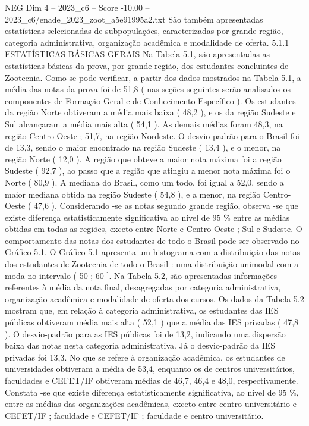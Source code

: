 \begin{textsample}{NEG Dim 4 – 2023\_c6 – Score -10.00 – 2023\_c6/enade\_2023\_zoot\_a5e91995a2.txt}
São também apresentadas estatísticas selecionadas de subpopulações, caracterizadas por grande região, categoria administrativa, organização acadêmica e modalidade de oferta. 5.1.1 ESTATÍSTICAS BÁSICAS GERAIS Na Tabela 5.1, são apresentadas as estatísticas básicas da prova, por grande região, dos estudantes concluintes de Zootecnia.
Como se pode verificar, a partir dos dados mostrados na Tabela 5.1, a média das notas da prova foi de 51,8 ( nas seções seguintes serão analisados os componentes de Formação Geral e de Conhecimento Específico ).
Os estudantes da região Norte obtiveram a média mais baixa ( 48,2 ), e os da região Sudeste e Sul alcançaram a média mais alta ( 54,1 ).
As demais médias foram 48,3, na região Centro-Oeste ; 51,7, na região Nordeste.
O desvio-padrão para o Brasil foi de 13,3, sendo o maior encontrado na região Sudeste ( 13,4 ), e o menor, na região Norte ( 12,0 ).
A região que obteve a maior nota máxima foi a região Sudeste ( 92,7 ), ao passo que a região que atingiu a menor nota máxima foi o Norte ( 80,9 ).
A mediana do Brasil, como um todo, foi igual a 52,0, sendo a maior mediana obtida na região Sudeste ( 54,8 ), e a menor, na região Centro-Oeste ( 47,6 ).
Considerando -se as notas segundo grande região, observa -se que existe diferença estatisticamente significativa ao nível de 95 \% entre as médias obtidas em todas as regiões, exceto entre Norte e Centro-Oeste ; Sul e Sudeste.
O comportamento das notas dos estudantes de todo o Brasil pode ser observado no Gráfico 5.1.
O Gráfico 5.1 apresenta um histograma com a distribuição das notas dos estudantes de Zootecnia de todo o Brasil : uma distribuição unimodal com a moda no intervalo ( 50 ; 60 ].
Na Tabela 5.2, são apresentadas informações referentes à média da nota final, desagregadas por categoria administrativa, organização acadêmica e modalidade de oferta dos cursos.
Os dados da Tabela 5.2 mostram que, em relação à categoria administrativa, os estudantes das IES públicas obtiveram média mais alta ( 52,1 ) que a média das IES privadas ( 47,8 ).
O desvio-padrão para as IES públicas foi de 13,2, indicando uma dispersão baixa das notas nesta categoria administrativa.
Já o desvio-padrão da IES privadas foi 13,3.
No que se refere à organização acadêmica, os estudantes de universidades obtiveram a média de 53,4, enquanto os de centros universitários, faculdades e CEFET/IF obtiveram médias de 46,7, 46,4 e 48,0, respectivamente.
Constata -se que existe diferença estatisticamente significativa, ao nível de 95 \%, entre as médias das organizações acadêmicas, exceto entre centro universitário e CEFET/IF ; faculdade e CEFET/IF ; faculdade e centro universitário.

\end{textsample}
